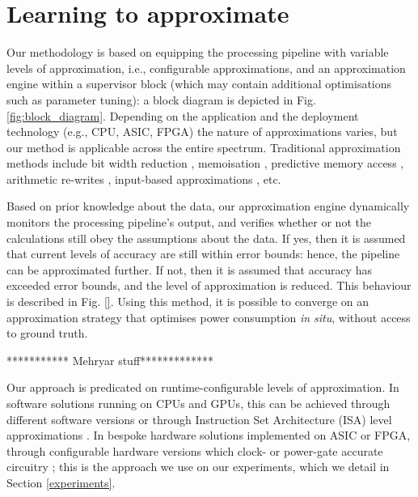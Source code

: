 \section{Learning to approximate}\label{learning}

Our methodology is based on equipping the processing pipeline with variable levels of approximation, i.e., configurable approximations, and an approximation engine within a supervisor block (which may contain additional optimisations such as parameter tuning): a block diagram is depicted in Fig. \ref{fig:block_diagram}. Depending on the application and the deployment technology (e.g., CPU, ASIC, FPGA) the nature of approximations varies, but our method is applicable across the entire spectrum. Traditional approximation methods include bit width reduction \cite{mittal2016survey}, memoisation \cite{sinha2016low}, predictive memory access \cite{yazdanbakhsh2016mitigating}, arithmetic re-writes \cite{nepal2016automated}, input-based approximations \cite{raha2016input}, etc.
\par Based on prior knowledge about the data, our approximation engine dynamically monitors the processing pipeline's output, and verifies whether or not the calculations still obey the assumptions about the data. If yes, then it is assumed that current levels of accuracy are still within error bounds: hence, the pipeline can be approximated further. If not, then it is assumed that accuracy has exceeded error bounds, and the level of approximation is reduced. This behaviour is described in Fig. \ref{}. Using this method, it is possible to converge on an approximation strategy that optimises power consumption \textit{in situ}, without access to ground truth. 
	 \par ************ Mehryar stuff************* 
\par Our approach is predicated on runtime-configurable levels of approximation. In software solutions running on CPUs and GPUs, this can be achieved through different software versions \cite{vassiliadis2015programming} or through Instruction Set Architecture (ISA) level approximations \cite{venkataramani2013quality}. In bespoke hardware solutions implemented on ASIC or FPGA, through configurable hardware versions which clock- or power-gate accurate circuitry \cite{chan2013statistical}; this is the approach we use on our experiments, which we detail in Section \ref{experiments}.

